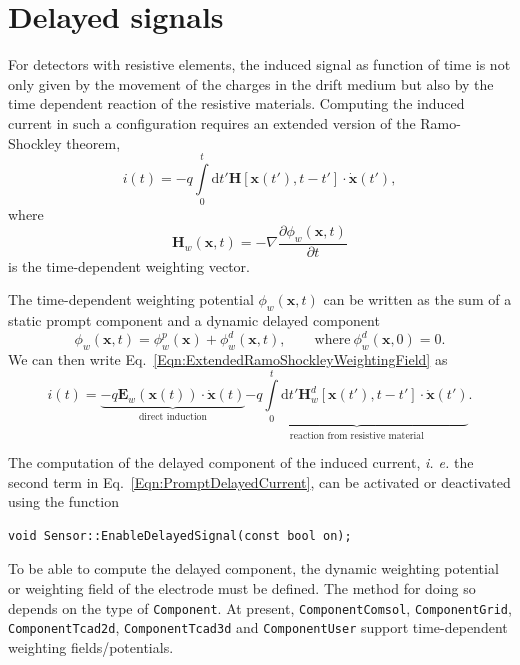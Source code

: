 \section{Delayed signals}
For detectors with resistive elements, the induced signal as function of time is not only given by the movement of the charges in the drift medium but also by the time dependent reaction of the resistive materials. 
Computing the induced current in such a configuration requires an extended version of the Ramo-Shockley theorem, 
\begin{equation}\label{Eqn:ExtendedRamoShockleyWeightingField}
i\left(t\right) = -q\int\limits_{0}^{t}\text{d}t'\mathbf{H}\left[\mathbf{x}\left(t'\right), t - t'\right]\cdot \dot{\mathbf{x}}\left(t'\right), 
\end{equation}
where 
\begin{equation*}
\mathbf{H}_{w}\left(\mathbf{x}, t\right) = -\nabla \frac{\partial\phi_{w}\left(\mathbf{x}, t\right)}{\partial t}
\end{equation*}
is the time-dependent weighting vector.

The time-dependent weighting potential $\phi_{w}\left(\mathbf{x}, t\right)$
can be written as the sum of a static prompt component and a dynamic delayed component
\begin{equation}
\phi_{w}\left(\mathbf{x}, t\right) = \phi_{w}^{p}\left(\mathbf{x}\right) + \phi_{w}^{d}\left(\mathbf{x}, t\right), \qquad \text{where}~\phi_{w}^{d}\left(\mathbf{x}, 0\right) = 0.
\end{equation} 
We can then write Eq.~\eqref{Eqn:ExtendedRamoShockleyWeightingField} as 
\begin{equation}\label{Eqn:PromptDelayedCurrent}
i\left(t\right) = \underbrace{-q\mathbf{E}_{w}\left(\mathbf{x}\left(t\right)\right)\cdot \dot{\mathbf{x}}\left(t\right)}_{\text{direct induction}} \underbrace{-q\int\limits_{0}^{t}\text{d}t'\mathbf{H}_{w}^{d}\left[\mathbf{x}\left(t'\right), t - t'\right]\cdot \dot{\mathbf{x}}\left(t'\right)}_{\text{reaction from resistive material}}.
\end{equation}

The computation of the delayed component of the induced current, \textit{i. e.} the second term in Eq.~\ref{Eqn:PromptDelayedCurrent}, can be activated or deactivated using the function
\begin{lstlisting}
void Sensor::EnableDelayedSignal(const bool on);
\end{lstlisting}
To be able to compute the delayed component, the dynamic weighting potential or weighting field of the electrode must be defined. The method for doing so depends on the type of \texttt{Component}. At present, \texttt{ComponentComsol}, \texttt{ComponentGrid}, \texttt{ComponentTcad2d}, \texttt{ComponentTcad3d} and \texttt{ComponentUser} support time-dependent weighting fields/potentials.
